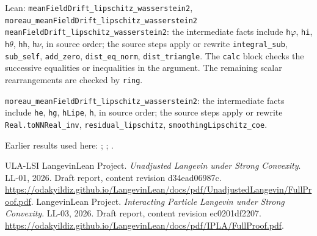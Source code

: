 \documentclass[11pt,a4paper]{article}
\begin{document}
\begin{leanbox}{Lean: \texttt{meanFieldDrift\_\allowbreak{}lipschitz\_\allowbreak{}wasserstein2}, \texttt{moreau\_\allowbreak{}meanFieldDrift\_\allowbreak{}lipschitz\_\allowbreak{}wasserstein2}}
\texttt{mean\allowbreak{}Field\allowbreak{}Drift\_\allowbreak{}lipschitz\_\allowbreak{}wasserstein2}: the intermediate facts include \texttt{h\ensuremath{\varphi}}, \texttt{hi}, \texttt{h\ensuremath{\theta}}, \texttt{hh}, \texttt{h\ensuremath{\nu}}, in source order; the source steps apply or rewrite \texttt{integral\_\allowbreak{}sub}, \texttt{sub\_\allowbreak{}self}, \texttt{add\_\allowbreak{}zero}, \texttt{dist\_\allowbreak{}eq\_\allowbreak{}norm}, \texttt{dist\_\allowbreak{}triangle}. The \texttt{calc} block checks the successive equalities or inequalities in the argument. The remaining scalar rearrangements are checked by \texttt{ring}.



\texttt{moreau\_\allowbreak{}mean\allowbreak{}Field\allowbreak{}Drift\_\allowbreak{}lipschitz\_\allowbreak{}wasserstein2}: the intermediate facts include \texttt{he}, \texttt{hg}, \texttt{h\allowbreak{}Lipe}, \texttt{h}, in source order; the source steps apply or rewrite \texttt{Real.\allowbreak{}to\allowbreak{}NNReal\_\allowbreak{}inv}, \texttt{residual\_\allowbreak{}lipschitz}, \texttt{smoothing\allowbreak{}Lipschitz\_\allowbreak{}coe}.
\end{leanbox}


Earlier results used here: \cite[Section~3.17.4]{LangevinLean2026ULASC}; \cite[Section~3.1.1]{LangevinLean2026IPLA}; \cite[Section~3.11.1]{LangevinLean2026IPLA}.

\begin{thebibliography}{ULA-LSI}
LangevinLean Project. \emph{Unadjusted Langevin under Strong Convexity}. LL-01, 2026. Draft report, content revision d34ead06987c. \url{https://odakyildiz.github.io/LangevinLean/docs/pdf/UnadjustedLangevin/FullProof.pdf}.
LangevinLean Project. \emph{Interacting Particle Langevin under Strong Convexity}. LL-03, 2026. Draft report, content revision ec0201df2207. \url{https://odakyildiz.github.io/LangevinLean/docs/pdf/IPLA/FullProof.pdf}.
\end{thebibliography}
\end{document}
